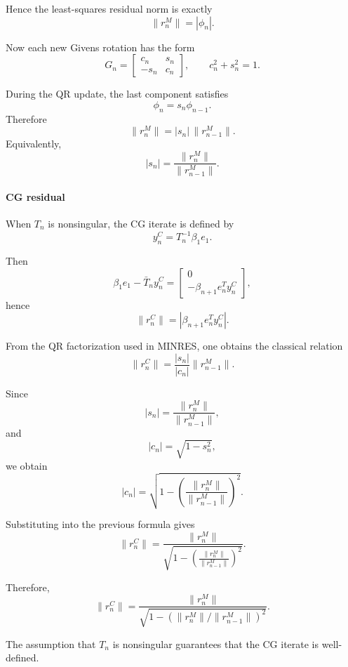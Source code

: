 \documentclass{ctexart}
\begin{document}
\begin{solution}
  Hence the least-squares residual norm is exactly
  \[
    \|r_n^M\|
    =
    |\phi_n|.
  \]

  Now each new Givens rotation has the form
  \[
    G_n=
    \begin{bmatrix}
      c_n & s_n\\
      -s_n & c_n
    \end{bmatrix},
    \qquad
    c_n^2+s_n^2=1.
  \]

  During the QR update, the last component satisfies
  \[
    \phi_n=s_n\phi_{n-1}.
  \]
  Therefore
  \[
    \|r_n^M\|
    =
    |s_n|\,\|r_{n-1}^M\|.
  \]
  Equivalently,
  \[
    |s_n|
    =
    \frac{\|r_n^M\|}{\|r_{n-1}^M\|}.
  \]

  \paragraph{CG residual}

  When \(T_n\) is nonsingular, the CG iterate is defined by
  \[
    y_n^C=T_n^{-1}\beta_1 e_1.
  \]

  Then
  \[
    \beta_1 e_1-\bar T_n y_n^C
    =
    \begin{bmatrix}
      0\\
      -\beta_{n+1}e_n^T y_n^C
    \end{bmatrix},
  \]
  hence
  \[
    \|r_n^C\|
    =
    |\beta_{n+1}e_n^T y_n^C|.
  \]

  From the QR factorization used in MINRES, one obtains the classical relation
  \[
    \|r_n^C\|
    =
    \frac{|s_n|}{|c_n|}
    \|r_{n-1}^M\|.
  \]

  Since
  \[
    |s_n|
    =
    \frac{\|r_n^M\|}{\|r_{n-1}^M\|},
  \]
  and
  \[
    |c_n|
    =
    \sqrt{1-s_n^2},
  \]
  we obtain
  \[
    |c_n|
    =
    \sqrt{
      1-
      \left(
        \frac{\|r_n^M\|}{\|r_{n-1}^M\|}
      \right)^2
    }.
  \]

  Substituting into the previous formula gives
  \[
    \|r_n^C\|
    =
    \frac{\|r_n^M\|}
    {
      \sqrt{
        1-
        \left(
          \frac{\|r_n^M\|}{\|r_{n-1}^M\|}
        \right)^2
      }
    }.
  \]

  Therefore,
  \[
    \boxed{
      \|r_n^C\|
      =
      \frac{\|r_n^M\|}
      {
        \sqrt{
          1-
          \left(
            \|r_n^M\|/\|r_{n-1}^M\|
          \right)^2
        }
      }
    }.
  \]

  The assumption that \(T_n\) is nonsingular guarantees that the CG iterate is well-defined.

\end{solution}
\end{document}
